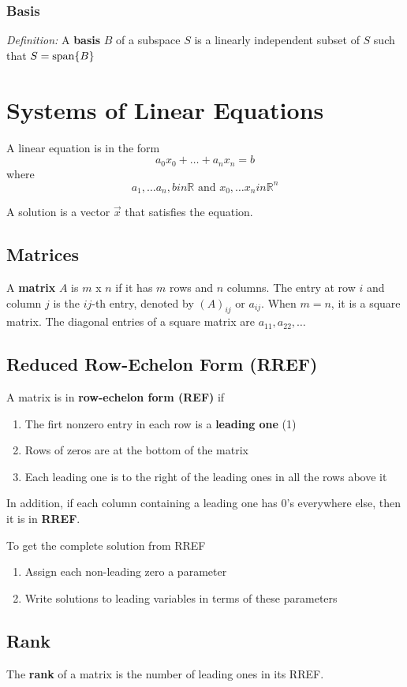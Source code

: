 \documentclass[12pt]{article}
\newcommand{\R}[1]{\mathbb{R}^{#1}}
\newcommand{\spanv}[1]{{\rm span}\{#1\}}
\begin{document}
\subsubsection*{Basis}
\textit{Definition:} A {\bf basis} $B$ of a subspace $S$ is a linearly independent subset of $S$ such that $S = \spanv{B}$

\section*{Systems of Linear Equations}
A linear equation is in the form \[ a_0x_0 + \dots + a_nx_n = b \] where \[ a_1,\dots a_n, bin\mathbb{R} \text{ and } x_0,\dots x_nin\R{n} \]

A solution is a vector $\vec{x}$ that satisfies the equation.

\subsection*{Matrices}
A {\bf matrix} $A$ is $m$ x $n$ if it has $m$ rows and $n$ columns. The entry at row $i$ and column $j$ is the $ij$-th entry, denoted by $(A)_{ij}$ or $a_{ij}$. When $m=n$, it is a square matrix. The diagonal entries of a square matrix are $a_{11}, a_{22}, \dots $

\subsection*{Reduced Row-Echelon Form (RREF)}
A matrix is in {\bf row-echelon form (REF)} if
\begin{enumerate}
\item The firt nonzero entry in each row is a {\bf leading one} (1)
\item Rows of zeros are at the bottom of the matrix
\item Each leading one is to the right of the leading ones in all the rows above it
\end{enumerate}

In addition, if each column containing a leading one has 0's everywhere else, then it is in {\bf RREF}.

To get the complete solution from RREF
\begin{enumerate}
\item Assign each non-leading zero a parameter
\item Write solutions to leading variables in terms of these parameters
\end{enumerate}

\subsection*{Rank}
The {\bf rank} of a matrix is the number of leading ones in its RREF.
\end{document}
